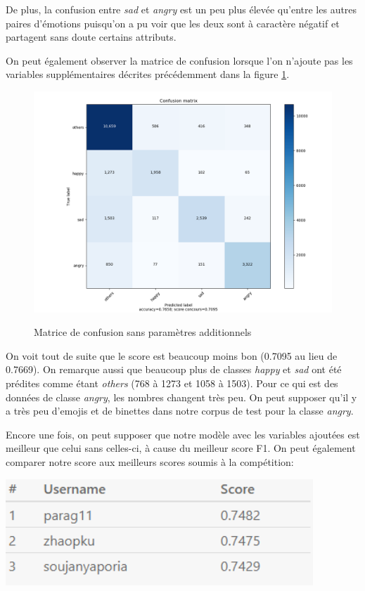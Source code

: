 De plus, la confusion entre \emph{sad} et \emph{angry} est un peu plus élevée qu'entre les autres paires d'émotions puisqu'on a pu voir que les deux sont à caractère négatif et partagent sans doute certains attributs.

On peut également observer la matrice de confusion lorsque l'on n'ajoute pas les variables supplémentaires décrites précédemment dans la figure \ref{fig:partial_confusion}.

\begin{figure}
	\caption{Matrice de confusion sans paramètres additionnels}
	\centering
	\includegraphics[width=\linewidth,keepaspectratio]{images/confusion_matrix_sans_features}
	\label{fig:partial_confusion}
\end{figure}

On voit tout de suite que le score est beaucoup moins bon (0.7095 au lieu de 0.7669). On remarque aussi que beaucoup plus de classes \emph{happy} et \emph{sad} ont été prédites comme étant \emph{others} (768 à 1273 et 1058 à 1503). Pour ce qui est des données de classe \emph{angry}, les nombres changent très peu. On peut  supposer qu'il y a très peu d'emojis et de binettes dans notre corpus de test pour la classe \emph{angry}.

Encore une fois, on peut supposer que notre modèle avec les variables ajoutées est meilleur que celui sans celles-ci, à cause du meilleur score F1. On peut également comparer notre score aux meilleurs scores soumis à la compétition:

\includegraphics[width=\linewidth,height=4cm,keepaspectratio]{images/meilleurs_scores}

